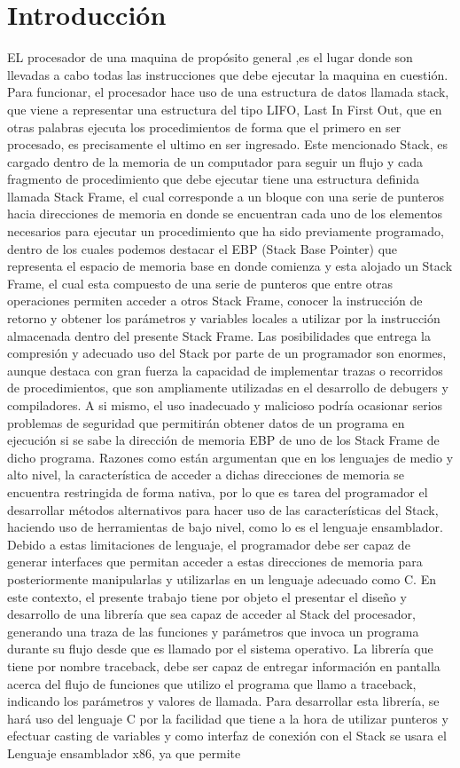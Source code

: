 \documentclass[twocolumn,11pts]{IEEEtran}
\begin{document}
\section{Introducción}
EL procesador de una maquina de propósito general ,es el lugar donde son llevadas a cabo todas las instrucciones que debe ejecutar la maquina en cuestión. Para funcionar, el procesador hace uso de una estructura de datos llamada stack, que viene a representar una estructura del tipo LIFO, Last In First Out, que en otras palabras ejecuta los procedimientos de forma que el primero en ser procesado, es precisamente el ultimo en ser ingresado. Este mencionado Stack, es cargado dentro de la memoria de un computador para seguir un flujo y cada fragmento de procedimiento que debe ejecutar tiene una estructura definida llamada Stack Frame, el cual corresponde a un bloque con una serie de punteros hacia direcciones de memoria en donde se encuentran cada uno de los elementos necesarios para ejecutar un procedimiento que ha sido previamente programado, dentro de los cuales podemos destacar el EBP (Stack Base Pointer) que representa el espacio de memoria base en donde comienza y esta alojado un Stack Frame, el cual esta compuesto de una serie de punteros que entre otras operaciones permiten acceder a otros Stack Frame, conocer la instrucción de retorno y obtener los parámetros y variables locales a utilizar por la instrucción almacenada dentro del presente Stack Frame. Las posibilidades que entrega la compresión y adecuado uso del Stack por parte de un programador son enormes, aunque destaca con gran fuerza la capacidad de implementar trazas o recorridos de procedimientos, que son ampliamente utilizadas en el desarrollo de debugers y compiladores. A si mismo, el uso inadecuado y malicioso podría ocasionar serios problemas de seguridad que permitirán obtener datos de un programa en ejecución si se sabe la dirección de memoria EBP de uno de los Stack Frame de dicho programa. Razones como están argumentan que en los lenguajes de medio y alto nivel, la característica de acceder a dichas direcciones de memoria se encuentra restringida de forma nativa, por lo que es tarea del programador el desarrollar métodos alternativos para hacer uso de las características del Stack, haciendo uso de herramientas de bajo nivel, como lo es el lenguaje ensamblador. Debido a estas limitaciones de lenguaje, el programador debe ser capaz de generar interfaces que permitan acceder a estas direcciones de memoria para posteriormente manipularlas y utilizarlas en un lenguaje adecuado como C. En este contexto, el presente trabajo tiene por objeto el presentar el diseño y desarrollo de una librería que sea capaz de acceder al Stack del procesador, generando una traza de las funciones y parámetros que invoca un programa durante su flujo desde que es llamado por el sistema operativo. La librería que tiene por nombre traceback, debe ser capaz de entregar información en pantalla acerca del flujo de funciones que utilizo el programa que llamo a traceback, indicando los parámetros y valores de llamada. Para desarrollar esta librería, se hará uso del lenguaje C por la facilidad que tiene a la hora de utilizar punteros y efectuar casting de variables y como interfaz de conexión con el Stack se usara el Lenguaje ensamblador x86, ya que permite 
\end{document}
